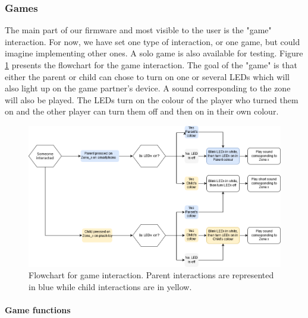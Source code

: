 \subsubsection{Games}
The main part of our firmware and most visible to the user is the "game" interaction. For now, we have set one type of interaction, or one game, but could imagine implementing other ones. A solo game is also available for testing. Figure \ref{fig:game_diagram} presents the flowchart for the game interaction. The goal of the "game" is that either the parent or child can chose to turn on one or several LEDs which will also light up on the game partner's device. A sound corresponding to the zone will also be played. The LEDs turn on the colour of the player who turned them on and the other player can turn them off and then on in their own colour. 

\begin{figure}[ht]
    \centering
    \includegraphics[width=\textwidth]{images/FW/FW_game_diagram.png}
    \caption{Flowchart for game interaction. Parent interactions are represented in blue while child interactions are in yellow.}
    \label{fig:game_diagram}
\end{figure}

\paragraph{Game functions}

